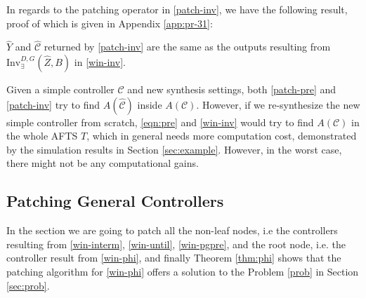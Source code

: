 In regards to the patching operator in \eqref{patch-inv}, we have the following result, proof of which is given in Appendix \ref{app:pr-31}:

\begin{theorem}
	$ \widehat{Y} $ and $ \widehat{\mathcal{C}} $ returned by \eqref{patch-inv} are the same as the outputs resulting from $ \text{Inv}_{\exists}^{D,G}(\widehat{Z},B) $ in \eqref{win-inv}.	\label{thm:inv}
\end{theorem}
Given a simple controller $ \mathcal{C} $ and new synthesis settings, both \eqref{patch-pre} and \eqref{patch-inv} try to find $ A(\widehat{\mathcal{C}}) $ inside $ A(\mathcal{C}) $. However, if we re-synthesize the new simple controller from scratch, \eqref{eqn:pre} and \eqref{win-inv} would try to find $ A(\mathcal{C}) $ in the whole AFTS $ T $, which in general needs more computation cost, demonstrated by the simulation results in Section \ref{sec:example}. However, in the worst case, there might not be any computational gains.

\subsection{Patching General Controllers}
\label{sec:patch-cont}

In the section we are going to patch all the non-leaf nodes, i.e  the controllers resulting from \eqref{win-interm}, \eqref{win-until}, \eqref{win-pgpre}, and the root node, i.e. the controller result from \eqref{win-phi}, and finally Theorem \ref{thm:phi} shows that the patching algorithm for \eqref{win-phi} offers a solution to the Problem \ref{prob} in Section \ref{sec:prob}.



